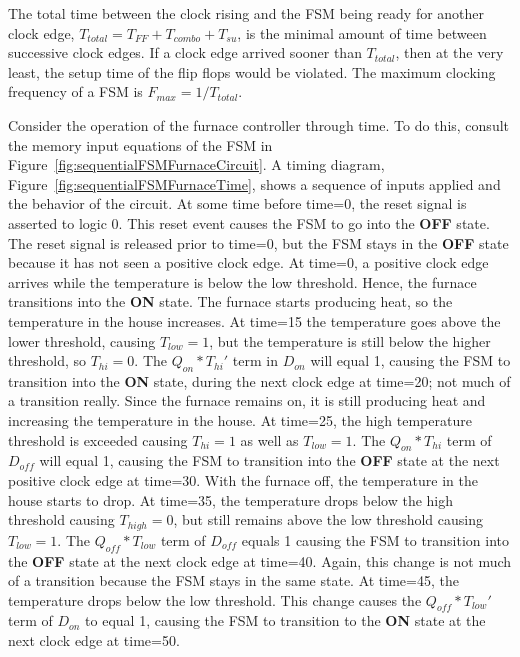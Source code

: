 The total time between the clock rising and the FSM being ready for another 
clock edge, $T_{total} = T_{FF} + T_{combo} + T_{su}$,  is the minimal 
amount of time between successive clock edges.  If a clock edge arrived 
sooner than $T_{total}$, then at the very least, the setup time of the 
flip flops would be violated.  The maximum clocking frequency 
of a FSM is $F_{max} = 1/T_{total}$.

Consider the operation of the furnace controller through time.
To do this, consult the memory input equations of the
FSM in Figure~\ref{fig:sequentialFSMFurnaceCircuit}.  A timing diagram, Figure~\ref{fig:sequentialFSMFurnaceTime}, 
shows a sequence of inputs applied and the
behavior of the circuit. At some time before time=0, the reset signal is
asserted to logic 0.  This reset event causes the FSM to go into the 
\textbf{ OFF} state.  The 
reset signal is released prior to time=0, but the FSM stays in the \textbf{ OFF}
state because it has not seen a positive clock edge.  At time=0, a positive
clock edge arrives  while the 
temperature is below the low threshold. Hence, the furnace transitions
into the \textbf{ ON} state.  The furnace starts producing heat, so the 
temperature in the house increases. At 
time=15 the temperature goes above the lower threshold, causing 
$T_{low}=1$, but the temperature is still below the higher threshold, so $T_{hi}=0$.
The $Q_{on}*T_{hi}'$ term in $D_{on}$ will equal 1, causing the FSM
to transition into the \textbf{ ON} state, during the next clock edge at time=20; 
not much of a transition really.  Since the furnace remains on, it is
still producing heat and increasing the temperature in the house.
At time=25, the high temperature threshold is exceeded causing
$T_{hi}=1$ as well as $T_{low}=1$.  The $Q_{on}*T_{hi}$ term of
$D_{off}$ will equal 1, causing the FSM to transition into the \textbf{ OFF}
state at the next positive clock edge at time=30.  With the furnace
off, the temperature in the house starts to drop.  At time=35, the
temperature drops below the high threshold causing $T_{high}=0$,
but still remains above the low threshold causing $T_{low}=1$.
The $Q_{off}*T_{low}$ term of $D_{off}$ equals 1 causing the
FSM to transition into the \textbf{ OFF} state at the next clock edge at
time=40.  Again, this change is not much of a transition because the FSM stays
in the same state.  At time=45, the temperature drops below the low 
threshold.  This change causes the $Q_{off}*T_{low}'$ term of $D_{on}$ to 
equal 1, causing the FSM to transition to the \textbf{ ON} state at the next 
clock edge at time=50.

